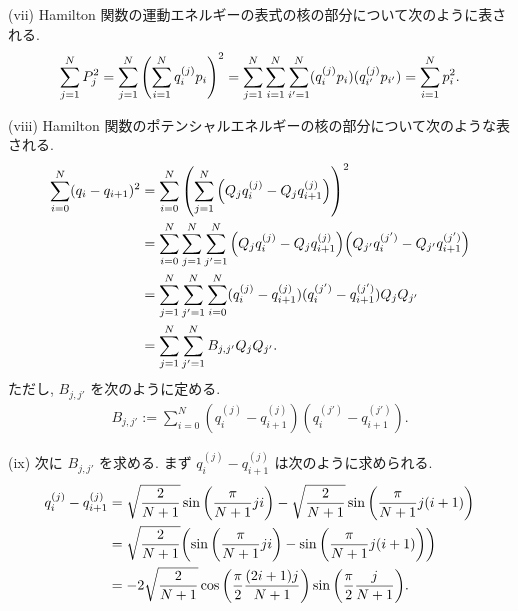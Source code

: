 \documentclass[uplatex,dvipdfmx,a4paper,11pt]{jlreq}
\theoremstyle{definition}
\begin{document}
(vii) Hamilton 関数の運動エネルギーの表式の核の部分について次のように表される.
\begin{align}
  \sum_{j=1}^{N}P_j^2 = \sum_{j=1}^{N}\qty(\sum_{i=1}^{N}q_i^{(j)}p_i)^2 = \sum_{j=1}^{N}\sum_{i=1}^{N}\sum_{i'=1}^{N}(q_i^{(j)}p_i)(q_{i'}^{(j)}p_{i'}) = \sum_{i=1}^{N}p_i^2.
\end{align}

(viii) Hamilton 関数のポテンシャルエネルギーの核の部分について次のような表される.
\begin{align}
  \sum_{i=0}^{N}(q_i - q_{i+1})^2 & = \sum_{i=0}^{N}\qty(\sum_{j=1}^{N}\qty(Q_jq_i^{(j)} - Q_jq_{i+1}^{(j)}))^2                                                     \\
                                  & = \sum_{i=0}^{N}\sum_{j=1}^{N}\sum_{j'=1}^{N}\qty(Q_jq_i^{(j)} - Q_jq_{i+1}^{(j)})\qty(Q_{j'}q_i^{(j')} - Q_{j'}q_{i+1}^{(j')}) \\
                                  & = \sum_{j=1}^{N}\sum_{j'=1}^{N}\sum_{i=0}^{N}(q_i^{(j)} - q_{i+1}^{(j)})(q_i^{(j')} - q_{i+1}^{(j')})Q_jQ_{j'}                  \\
                                  & = \sum_{j=1}^{N}\sum_{j'=1}^{N}B_{j,j'}Q_jQ_{j'}.
\end{align}
ただし, $B_{j,j'}$ を次のように定める.
\begin{align}
  B_{j,j'} := \sum_{i=0}^{N}(q_i^{(j)} - q_{i+1}^{(j)})(q_i^{(j')} - q_{i+1}^{(j')}).
\end{align}

(ix) 次に $B_{j,j'}$ を求める. まず $q_i^{(j)} - q_{i+1}^{(j)}$ は次のように求められる.
\begin{align}
  q_i^{(j)} - q_{i+1}^{(j)} & = \sqrt{\frac{2}{N+1}}\sin\qty(\frac{\pi}{N+1}ji) - \sqrt{\frac{2}{N+1}}\sin\qty(\frac{\pi}{N+1}j(i+1)) \\
                            & = \sqrt{\frac{2}{N+1}}\qty(\sin\qty(\frac{\pi}{N+1}ji) - \sin\qty(\frac{\pi}{N+1}j(i+1)))               \\
                            & = -2\sqrt{\frac{2}{N+1}}\cos\qty(\frac{\pi}{2}\frac{(2i+1)j}{N+1})\sin\qty(\frac{\pi}{2}\frac{j}{N+1}).
\end{align}
\end{document}
